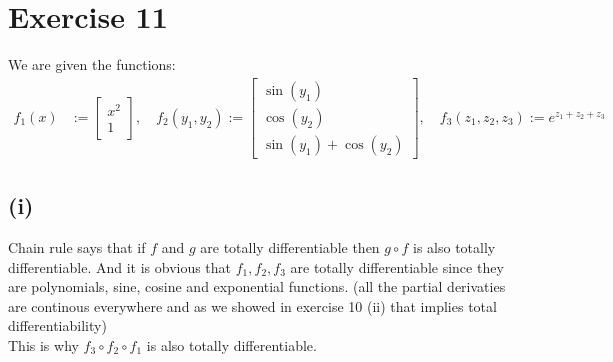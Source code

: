 \documentclass{article}
\begin{document}
\section*{Exercise 11}
We are given the functions:
\begin{align*}
   f_1(x) &:= \begin{bmatrix}
      x^2 \\
      1
   \end{bmatrix}, \quad f_2(y_1, y_2) := \begin{bmatrix}
      \sin(y_1) \\
      \cos(y_2) \\
      \sin(y_1) + \cos(y_2)
   \end{bmatrix}, \quad f_3(z_1, z_2, z_3) := e^{z_1 + z_2 + z_3}
\end{align*}

\subsection*{(i)}
Chain rule says that if \(f\) and \(g\) are totally differentiable then \(g \circ f\) is also totally differentiable. And it is obvious that \(f_1, f_2, f_3\) are totally differentiable since they are polynomials, sine, cosine and exponential functions.
(all the partial derivaties are continous everywhere and as we showed in exercise 10 (ii) that implies total differentiability) \\
This is why \(f_3 \circ f_2 \circ f_1\) is also totally differentiable.
\end{document}
